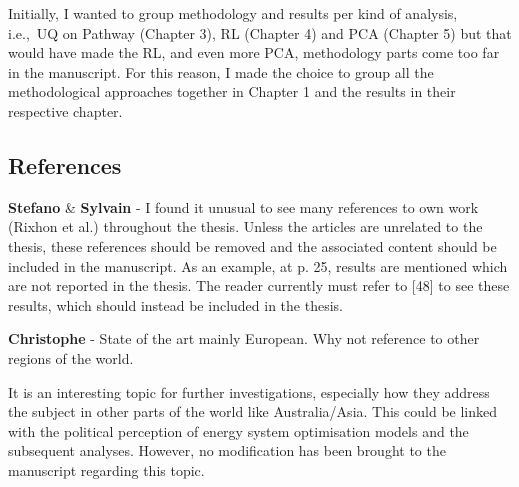 \documentclass[12pt,a4paper]{article}
\def\ie{i.e.,\ }
\begin{document}
\noindent Initially, I wanted to group methodology and results per kind of analysis, \ie UQ on Pathway (Chapter 3), RL (Chapter 4) and PCA (Chapter 5) but that would have made the RL, and even more PCA, methodology parts come too far in the manuscript. For this reason, I made the choice to group all the methodological approaches together in Chapter 1 and the results in their respective chapter. 

\begin{mdframed}[style=manuscript] %

\end{mdframed}

\subsection{References}
\label{references}

\begin{mdframed}[style=comment] %
{\color{orange} \textbf{Stefano}} \& {\color{purple} \textbf{Sylvain}} - I found it unusual to see many references to own work (Rixhon et al.) throughout the thesis. Unless the articles are unrelated to the thesis, these references should be removed and the associated content should be included in the manuscript. As an example, at p. 25, results are mentioned which are not reported in the thesis. The reader currently must refer to [48] to see these results, which should instead be included in the thesis. 
\end{mdframed}

\noindent

\begin{mdframed}[style=manuscript] %

\end{mdframed}

\begin{mdframed}[style=comment] %
{\color{violet} \textbf{Christophe}} - State of the art mainly European. Why not reference to other regions of the world.
\end{mdframed}

\noindent
It is an interesting topic for further investigations, especially how they address the subject in other parts of the world like Australia/Asia. This could be linked with the political perception of energy system optimisation models and the subsequent analyses. However, no modification has been brought to the manuscript regarding this topic.
\end{document}
